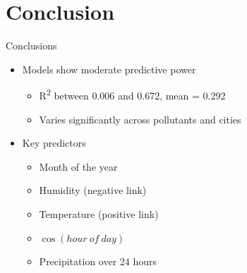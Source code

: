 \documentclass[svgnames, 12pt]{beamer}
\begin{document}

\section{Conclusion}

\begin{frame}{Conclusions}
\begin{itemize}
    \item Models show moderate predictive power
        \begin{itemize}
            \item R\textsuperscript{2} between 0.006 and 0.672, mean = 0.292
            \item Varies significantly across pollutants and cities
        \end{itemize}
    \item Key predictors
        \begin{itemize}
            \item Month of the year
            \item Humidity (negative link)
            \item Temperature (positive link)
            \item $\cos(hour\ of\ day)$
            \item Precipitation over 24 hours
        \end{itemize}
\end{itemize}
\end{frame}
\end{document}
